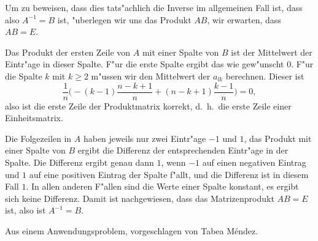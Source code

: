 \begin{loesung}
\begin{teilaufgaben}
Um zu beweisen, dass dies tats"achlich die Inverse im allgemeinen Fall ist,
dass also $A^{-1}=B$ ist, "uberlegen wir uns das Produkt $AB$,
wir erwarten, dass $AB=E$. 

Das Produkt der ersten Zeile von $A$ mit einer Spalte von $B$ ist der
Mittelwert der Eintr"age in dieser Spalte.
F"ur die erste Spalte ergibt das wie gew"unscht $0$.
F"ur die Spalte $k$ mit $k\ge 2$ m"ussen wir den Mittelwert der $a_{lk}$ berechnen.
Dieser ist
\[
\frac1n\biggl(-(k-1)\frac{n-k+1}n+(n-k+1)\frac{k-1}n\biggr)
=0,
\]
also ist die erste Zeile der Produktmatrix korrekt, d.~h.~die erste Zeile
einer Einheitsmatrix.

Die Folgezeilen in $A$ haben jeweils nur zwei Eintr"age $-1$ und $1$,
das Produkt mit einer Spalte von $B$ ergibt die Differenz der entsprechenden
Eintr"age in der Spalte. Die Differenz ergibt genau dann $1$, wenn $-1$ 
auf einen negativen Eintrag und $1$ auf eine positiven Eintrag der Spalte
f"allt, und die Differenz ist in diesem Fall $1$.
In allen anderen F"allen sind die Werte einer Spalte konstant, es ergibt sich
keine Differenz.
Damit ist nachgewiesen, dass das Matrizenprodukt $AB=E$ ist, also ist
$A^{-1}=B$.
\qedhere
\end{teilaufgaben}
\end{loesung}

\begin{diskussion}
Aus einem Anwendungsproblem, vorgeschlagen von Tabea M\'endez.
\end{diskussion}


